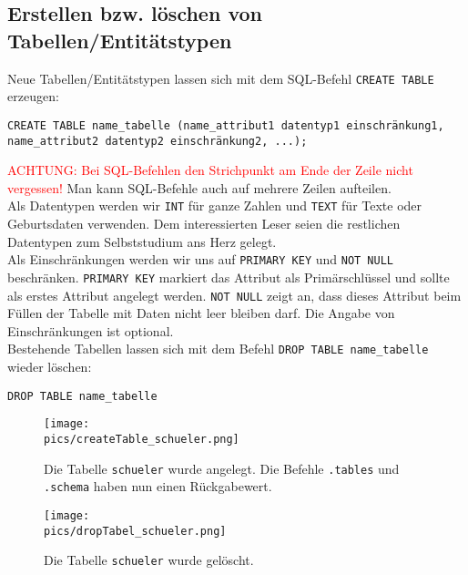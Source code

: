 \subsection{Erstellen bzw. löschen von Tabellen/Entitätstypen}
Neue Tabellen/Entitätstypen lassen sich mit dem SQL-Befehl \lstinline!CREATE TABLE! erzeugen:\\
\begin{tcolorbox}[title=Tabellen erstellen]
	\lstinline[breaklines=true]!CREATE TABLE name_tabelle (name_attribut1 datentyp1 einschränkung1, name_attribut2 datentyp2 einschränkung2, ...);!
\end{tcolorbox}
\textcolor{red}{ACHTUNG: Bei SQL-Befehlen den Strichpunkt am Ende der Zeile nicht vergessen!} Man kann SQL-Befehle auch auf mehrere Zeilen aufteilen.\\
Als Datentypen werden wir \lstinline!INT! für ganze Zahlen und \lstinline!TEXT! für Texte oder Geburtsdaten verwenden. Dem interessierten Leser seien die restlichen Datentypen zum Selbststudium ans Herz gelegt.\\
Als Einschränkungen werden wir uns auf \lstinline!PRIMARY KEY! und \lstinline!NOT NULL! beschränken. \lstinline!PRIMARY KEY! markiert das Attribut als Primärschlüssel und sollte als erstes Attribut angelegt werden. \lstinline!NOT NULL! zeigt an, dass dieses Attribut beim Füllen der Tabelle mit Daten nicht leer bleiben darf. Die Angabe von Einschränkungen ist optional.\\
Bestehende Tabellen lassen sich mit dem Befehl \lstinline!DROP TABLE name_tabelle! wieder löschen:
\begin{tcolorbox}[title=Tabellen löschen]
	\lstinline[breaklines=true]!DROP TABLE name_tabelle !
\end{tcolorbox}
\begin{figure}[h]
	\centering
	\texttt{[image: \\pics/createTable\_schueler.png]}
	\caption*{Die Tabelle \lstinline!schueler! wurde angelegt. Die Befehle \lstinline!.tables! und \lstinline!.schema! haben nun einen Rückgabewert.}
\end{figure}
\begin{figure}[h]
	\centering
	\texttt{[image: \\pics/dropTabel\_schueler.png]}
	\caption*{Die Tabelle \lstinline!schueler! wurde gelöscht.}
\end{figure}

